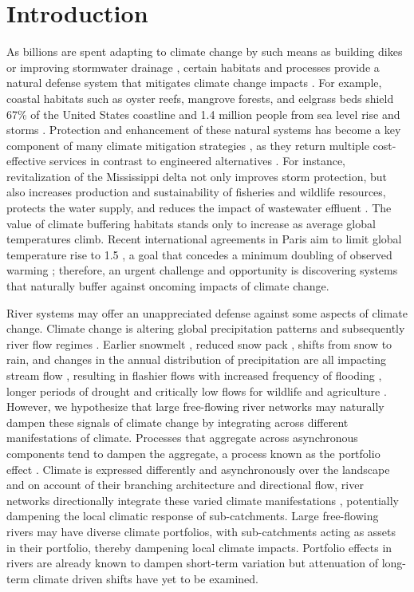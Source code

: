 \documentclass[linenumbers,draft]{AGUJournal}
\begin{document}
\section{Introduction} 
As billions are spent adapting to climate change by such means as building dikes or improving stormwater drainage \citep{Narain:2011}, certain habitats and processes provide a natural defense system that mitigates climate change impacts \citep{Jones:2012}. For example, coastal habitats such as oyster reefs, mangrove forests, and eelgrass beds shield 67\% of the United States coastline and 1.4 million people from sea level rise and storms \citep{Arkema:2013}. Protection and enhancement of these natural systems has become a key component of many climate mitigation strategies \citep{Guerry:2015}, as they return multiple cost-effective services in contrast to engineered alternatives \citep{Jones:2012}. For instance, revitalization of the Mississippi delta not only improves storm protection, but also increases production and sustainability of fisheries and wildlife resources, protects the water supply, and reduces the impact of wastewater effluent \citep{Conservation:1998}. The value of climate buffering habitats stands only to increase as average global temperatures climb. Recent international agreements in Paris aim to limit global temperature rise to 1.5 \citep{Hulme:2016}, a goal that concedes a minimum doubling of observed warming \citep{Hartmann:2013}; therefore, an urgent challenge and opportunity is discovering systems that naturally buffer against oncoming impacts of climate change.

River systems may offer an unappreciated defense against some aspects of climate change. Climate change is altering global precipitation patterns \citep{Donat:2016} and subsequently river flow regimes \citep{Hartmann:2013,Palmer:2009}. Earlier snowmelt \citep{Rauscher:2008}, reduced snow pack \citep{McCabe:2014}, shifts from snow to rain, and changes in the annual distribution of precipitation are all impacting stream flow \citep{Hartmann:2013}, resulting in flashier flows with increased frequency of flooding \citep{Hirabayashi:2013}, longer periods of drought and critically low flows for wildlife and agriculture \citep{Melillo:2014}. However, we hypothesize that large free-flowing river networks may naturally dampen these signals of climate change by integrating across different manifestations of climate. Processes that aggregate across asynchronous components tend to dampen the aggregate, a process known as the portfolio effect \citep{Doak:1998}. Climate is expressed differently and asynchronously over the landscape \citep{George:2015} and on account of their branching architecture and directional flow, river networks directionally integrate these varied climate manifestations \citep{Peterson:2013}, potentially dampening the local climatic response of sub-catchments. Large free-flowing rivers may have diverse climate portfolios, with sub-catchments acting as assets in their portfolio, thereby dampening local climate impacts. Portfolio effects in rivers are already known to dampen short-term variation \citep{Moore:2015,Yeakel:2014} but attenuation of long-term climate driven shifts have yet to be examined.
\end{document}
